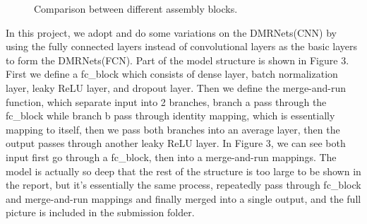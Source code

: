 \documentclass{article}
\begin{document}
\begin{figure} [H]
  \centering
  \caption{Comparison between different assembly blocks.}
\end{figure}

In this project, we adopt and do some variations on the DMRNets(CNN) by using the fully connected layers instead of convolutional layers as the basic layers to form the DMRNets(FCN). Part of the model structure is shown in Figure $3$. First we define a fc\_block which consists of dense layer, batch normalization layer, leaky ReLU layer, and dropout layer. Then we define the merge-and-run function, which separate input into 2 branches, branch a pass through the fc\_block while branch b pass through identity mapping, which is essentially mapping to itself, then we pass both branches into an average layer, then the output passes through another leaky ReLU layer. In Figure 3, we can see both input first go through a fc\_block, then into a merge-and-run mappings. The model is actually so deep that the rest of the structure is too large to be shown in the report, but it’s essentially the same process, repeatedly pass through fc\_block and merge-and-run mappings and finally merged into a single output, and the full picture is included in the submission folder.
\end{document}
